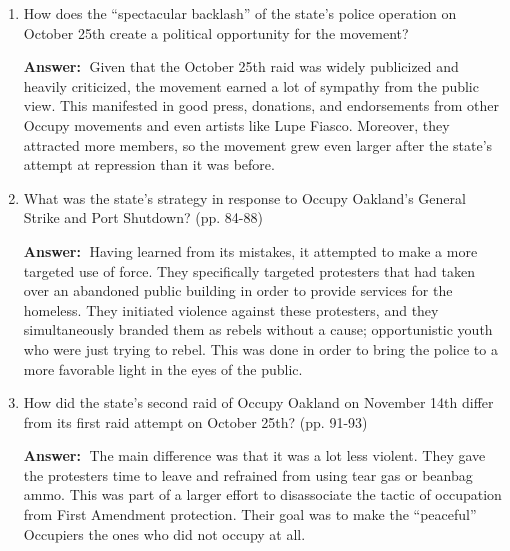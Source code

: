 \documentclass{article}
\newcommand{\answer}{\textbf{Answer:}$\;$}
\begin{document}
\begin{enumerate}[label=\arabic*)]
    \item How does the ``spectacular backlash'' of the state's police operation on October 25th create a political opportunity for the movement?
    
    \answer
    Given that the October 25th raid was widely publicized and heavily criticized, the movement earned a lot of sympathy from the public view.
    This manifested in good press, donations, and endorsements from other Occupy movements and even artists like Lupe Fiasco.
    Moreover, they attracted more members, so the movement grew even larger after the state's attempt at repression than it was before.
    

    \item What was the state's strategy in response to Occupy Oakland's General Strike and Port Shutdown? (pp. 84-88)
    
    \answer
    Having learned from its mistakes, it attempted to make a more targeted use of force.
    They specifically targeted protesters that had taken over an abandoned public building in order to provide services for the homeless. 
    They initiated violence against these protesters, and they simultaneously branded them as rebels without a cause; opportunistic youth who were just trying to rebel.
    This was done in order to bring the police to a more favorable light in the eyes of the public.
    
    \item How did the state's second raid of Occupy Oakland on November 14th differ from its first raid attempt on October 25th? (pp. 91-93)
    
    \answer
    The main difference was that it was a lot less violent.
    They gave the protesters time to leave and refrained from using tear gas or beanbag ammo.
    This was part of a larger effort to disassociate the tactic of occupation from First Amendment protection.
    Their goal was to make the ``peaceful'' Occupiers the ones who did not occupy at all.
    
\end{enumerate}
 
\end{document}
